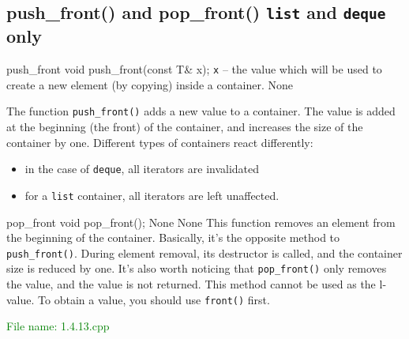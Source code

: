 
\subsection{push\_front() and pop\_front() \texttt{list} and \texttt{deque} only} %
\begin{methodinfo}
  {push_front}
  {void push_front(const T& x);}
  {\texttt{x} – the value which will be used to create a new element (by copying) inside a container.}
  {None}
  {The function \texttt{push\_front()} adds a new value to a container. The value is added at the 
  beginning (the front) of the container, and increases the size of the container by one. Different 
  types of containers react differently:
  \begin{itemize}
    \item in the case of \texttt{deque}, all iterators are invalidated
    \item for a \texttt{list} container, all iterators are left unaffected.
  \end{itemize}}
\end{methodinfo}

\begin{methodinfo}
  {pop_front}
  {void pop_front();}
  {None}
  {None}
  {This function removes an element from the beginning of the container. Basically, it’s 
  the opposite method to \texttt{push\_front()}. During element removal, its destructor is called, 
  and the container size is reduced by one. It’s also worth noticing that \texttt{pop\_front()} only 
  removes the value, and the value is not returned. This method cannot be used as the l-value. 
  To obtain a value, you should use \texttt{front()} first.}
\end{methodinfo}

\textcolor{green}{File name: 1.4.13.cpp}


